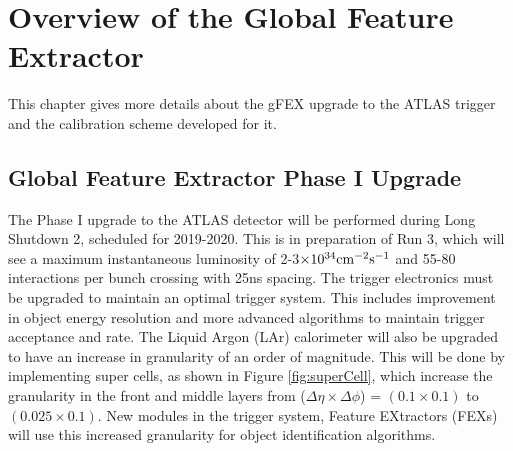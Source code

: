 \chapter{Overview of the Global Feature Extractor}
\label{ch:gFEX}

This chapter gives more details about the gFEX upgrade to the ATLAS trigger and the calibration scheme developed for it.

\section{Global Feature Extractor Phase I Upgrade}

The Phase I upgrade to the ATLAS detector will be performed during Long Shutdown 2, scheduled for 2019-2020.  This is in preparation of Run 3, which will see a maximum instantaneous luminosity of 2-3$\times 10^{34} \rm{cm}^{-2} \rm{s}^{-1}$ and 55-80 interactions per bunch crossing with 25ns spacing.  The trigger electronics must be upgraded to maintain an optimal trigger system.  This includes improvement in object energy resolution and more advanced algorithms to maintain trigger acceptance and rate.  The Liquid Argon (LAr) calorimeter will also be upgraded to have an increase in granularity of an order of magnitude.  This will be done by implementing super cells, as shown in Figure \ref{fig:superCell}, which increase the granularity in the front and middle layers from ($\Delta \eta \times \Delta \phi $) = $(0.1 \times 0.1)$ to $(0.025 \times 0.1)$.  New modules in the trigger system, Feature EXtractors (FEXs) will use this increased granularity for object identification algorithms. \\


